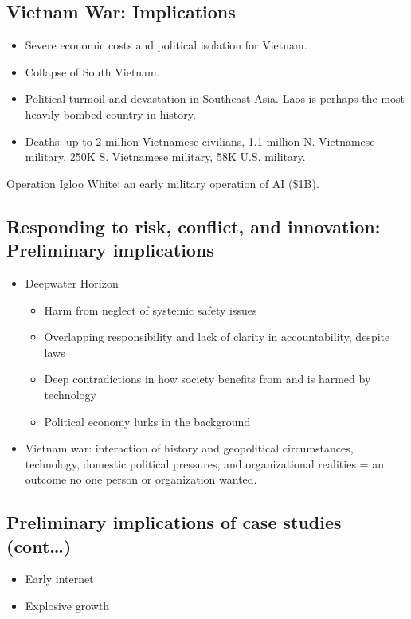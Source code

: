 \documentclass{article}
\begin{document}
\subsection{Vietnam War: Implications}
\begin{itemize}
  \item Severe economic costs and political isolation for Vietnam.
  \item Collapse of South Vietnam.
  \item Political turmoil and devastation in Southeast Asia.  Laos is perhaps the most heavily bombed country in history.
  \item Deaths: up to 2 million Vietnamese civilians, 1.1 million N. Vietnamese military, 250K S. Vietnamese military, 58K U.S. military.
\end{itemize}

Operation Igloo White: an early military operation of AI (\$1B).

\subsection{Responding to risk, conflict, and innovation: Preliminary implications}
\begin{itemize}
  \item Deepwater Horizon
    \begin{itemize}
      \item Harm from neglect of systemic safety issues
      \item Overlapping responsibility and lack of clarity in accountability, despite laws
      \item Deep contradictions in how society benefits from and is harmed by technology
      \item Political economy lurks in the background
    \end{itemize}
  \item Vietnam war: interaction of history and geopolitical circumstances, technology, domestic political pressures, and organizational realities = an outcome no one person or organization wanted.
\end{itemize}

\subsection{Preliminary implications of case studies (cont\dots)}

\begin{itemize}
  \item Early internet
  \item Explosive growth
\end{itemize}
\end{document}
